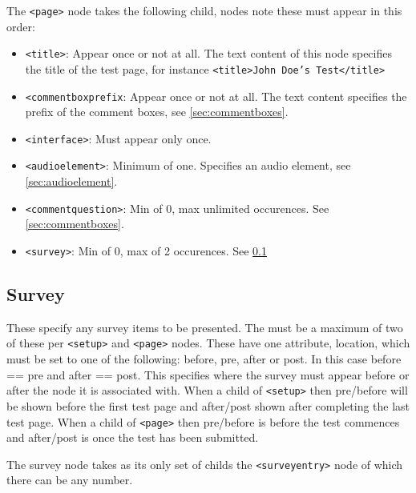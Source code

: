\documentclass[11pt, oneside]{article}   	%
\begin{document}
        The \texttt{<page>} node takes the following child, nodes note these must appear in this order:
        \begin{itemize}
            \item \texttt{<title>}: Appear once or not at all. The text content of this node specifies the title of the test page, for instance \texttt{<title>John Doe's Test</title>}
            \item \texttt{<commentboxprefix}: Appear once or not at all. The text content specifies the prefix of the comment boxes, see \ref{sec:commentboxes}.
            \item \texttt{<interface>}: Must appear only once.
            \item \texttt{<audioelement>}: Minimum of one. Specifies an audio element, see \ref{sec:audioelement}.
            \item \texttt{<commentquestion>}: Min of 0, max unlimited occurences. See \ref{sec:commentboxes}.
            \item \texttt{<survey>}: Min of 0, max of 2 occurences. See \ref{sec:survey}
        \end{itemize}

    \subsection{Survey}
    \label{sec:survey}
        These specify any survey items to be presented. The must be a maximum of two of these per \texttt{<setup>} and \texttt{<page>} nodes. These have one attribute, location, which must be set to one of the following: before, pre, after or post. In this case before == pre and after == post. This specifies where the survey must appear before or after the node it is associated with. When a child of \texttt{<setup>} then pre/before will be shown before the first test page and after/post shown after completing the last test page. When a child of \texttt{<page>} then pre/before is before the test commences and after/post is once the test has been submitted.
        
        The survey node takes as its only set of childs the \texttt{<surveyentry>} node of which there can be any number.
        
\end{document}
